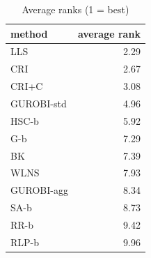 \begin{table}[htbp]
\centering
\small
\caption{Average ranks (1 = best)}
\label{tab:E4a_equal_budgets_b1_ranks}
\begin{tabular}{lr}
\toprule
method & average rank \\
\midrule
LLS & 2.29 \\
CRI & 2.67 \\
CRI+C & 3.08 \\
GUROBI-std & 4.96 \\
HSC-b & 5.92 \\
G-b & 7.29 \\
BK & 7.39 \\
WLNS & 7.93 \\
GUROBI-agg & 8.34 \\
SA-b & 8.73 \\
RR-b & 9.42 \\
RLP-b & 9.96 \\
\bottomrule
\end{tabular}
\end{table}
